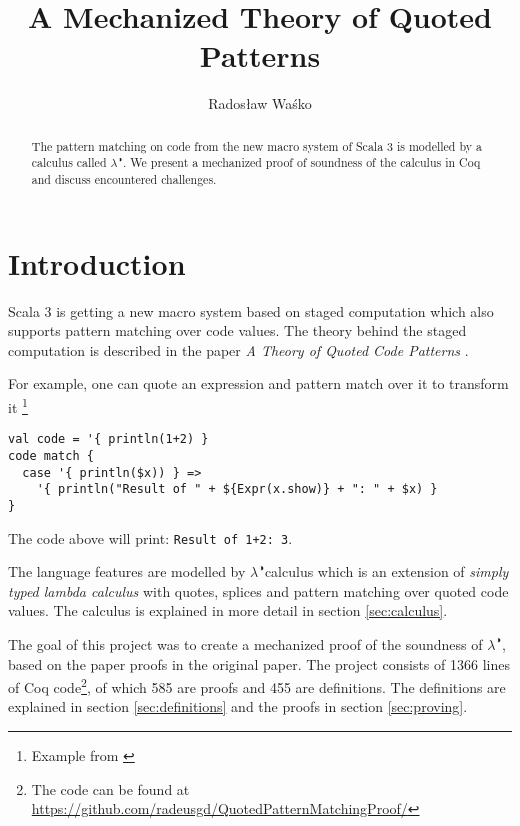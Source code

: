 \documentclass[runningheads]{article}
\newcommand{\calculus}{$\lambda^{\RIGHTcircle}$}
\begin{document}
\title{A Mechanized Theory of Quoted Patterns}
%
\author{Radosław Waśko}

%
%
%
\maketitle              %
\begin{abstract}
The pattern matching on code from the new macro system of Scala 3 is modelled by a calculus called \calculus. We present a mechanized proof of soundness of the calculus in Coq and discuss encountered challenges.
%
\end{abstract}
%
%
\section{Introduction}

Scala 3 is getting a new macro system based on staged computation \cite{dottydocMacro} which also supports pattern matching over code values. The theory behind the staged computation is described in the paper \textit{A Theory of Quoted Code Patterns} \cite{QPM}. 

For example, one can quote an expression and pattern match over it to transform it \footnote{Example from \cite{QPM}}

\begin{lstlisting}[style=myScalaStyle]
val code = '{ println(1+2) }
code match {
  case '{ println($x)) } =>
    '{ println("Result of " + ${Expr(x.show)} + ": " + $x) }
}
\end{lstlisting}

The code above will print: \texttt{Result of 1+2: 3}.

The language features are modelled by \calculus calculus which is an extension of \textit{simply typed lambda calculus} with quotes, splices and pattern matching over quoted code values. The calculus is explained in more detail in section \ref{sec:calculus}.

The goal of this project was to create a mechanized proof of the soundness of \calculus, based on the paper proofs in the original paper. The project consists of 1366 lines of Coq code\footnote{The code can be found at  \href{https://github.com/radeusgd/QuotedPatternMatchingProof/}{https://github.com/radeusgd/QuotedPatternMatchingProof/}}, of which 585 are proofs and 455 are definitions. The definitions are explained in section \ref{sec:definitions} and the proofs in section \ref{sec:proving}.
\end{document}
